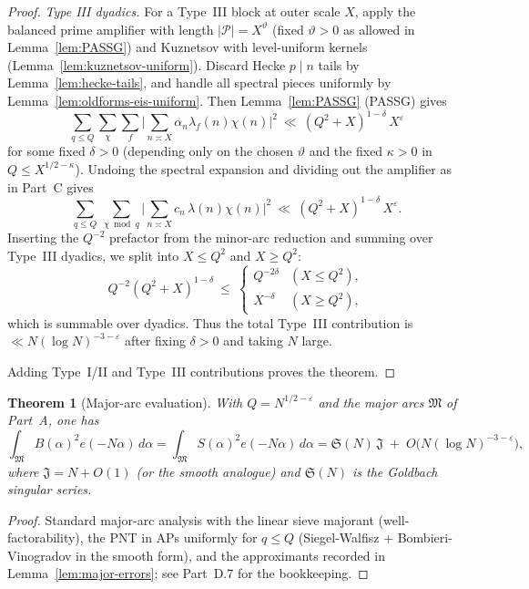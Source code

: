 \documentclass[11pt]{article}
\newtheorem{theorem}[lemma]{Theorem}
\theoremstyle{definition}
\theoremstyle{remark}
\numberwithin{equation}{part}
\begin{document}
\begin{proof}
	\emph{Type III dyadics.} For a Type~III block at outer scale $X$, apply the balanced prime amplifier with length $|\mathcal P|=X^\vartheta$ (fixed $\vartheta>0$ as allowed in Lemma~\ref{lem:PASSG}) and Kuznetsov with level-uniform kernels (Lemma~\ref{lem:kuznetsov-uniform}).
	Discard Hecke $p\mid n$ tails by Lemma~\ref{lem:hecke-tails}, and handle all spectral pieces uniformly by Lemma~\ref{lem:oldforms-eis-uniform}.
	Then Lemma~\ref{lem:PASSG} (PASSG) gives
	\[
		\sum_{q\le Q}\sum_{\chi}\sum_f
		\Big|\sum_{n\asymp X}\alpha_n\lambda_f(n)\chi(n)\Big|^2
		\ \ll\ (Q^2+X)^{1-\delta}\,X^\varepsilon
	\]
	for some fixed $\delta>0$ (depending only on the chosen $\vartheta$ and the fixed $\kappa>0$ in $Q\le X^{1/2-\kappa}$).
	Undoing the spectral expansion and dividing out the amplifier as in Part~C gives
	\[
		\sum_{q\le Q}\ \sum_{\chi\bmod q}\Big|\sum_{n\asymp X} c_n\,\lambda(n)\chi(n)\Big|^2
		\ \ll\ (Q^2+X)^{1-\delta}\,X^\varepsilon.
	\]
	Inserting the $Q^{-2}$ prefactor from the minor-arc reduction and summing over Type~III dyadics, we split into $X\le Q^2$ and $X\ge Q^2$:
	\[
		Q^{-2}(Q^2+X)^{1-\delta}\ \le\
		\begin{cases}
			Q^{-2\delta} & (X\le Q^2), \\
			X^{-\delta}  & (X\ge Q^2),
		\end{cases}
	\]
	which is summable over dyadics. Thus the total Type~III contribution is $\ll N(\log N)^{-3-\varepsilon}$ after fixing $\delta>0$ and taking $N$ large.

	Adding Type~I/II and Type~III contributions proves the theorem.
\end{proof}

\begin{theorem}[Major-arc evaluation]\label{thm:major-eval}
	With $Q=N^{1/2-\varepsilon}$ and the major arcs $\mathfrak M$ of Part~A, one has
	\[
		\int_{\mathfrak M} B(\alpha)^2 e(-N\alpha)\,d\alpha
		=\int_{\mathfrak M} S(\alpha)^2 e(-N\alpha)\,d\alpha
		=\mathfrak S(N)\,\mathfrak J\;+\;O\!\big(N(\log N)^{-3-\varepsilon}\big),
	\]
	where $\mathfrak J=N+O(1)$ (or the smooth analogue) and $\mathfrak S(N)$ is the Goldbach singular series.
\end{theorem}

\begin{proof}
	Standard major-arc analysis with the linear sieve majorant (well-factorability), the PNT in APs uniformly for $q\le Q$ (Siegel-Walfisz + Bombieri-Vinogradov in the smooth form), and the approximants recorded in Lemma~\ref{lem:major-errors}; see Part~D.7 for the bookkeeping.
\end{proof}
\end{document}
